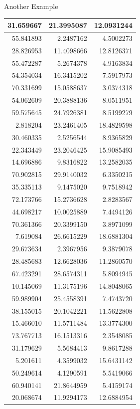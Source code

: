 \documentclass[
  ignorenonframetext,
]{beamer}
\begin{document}
\begin{frame}{Another Example}
\begin{table}
\begin{tabular}[t]{r|r|r}
\hline
31.659667 & 21.3995087 & 12.0931244\\
\hline
55.841893 & 2.2487162 & 4.5002273\\
\hline
28.826953 & 11.4098666 & 12.8126371\\
\hline
55.472287 & 5.2674378 & 4.9163834\\
\hline
54.354034 & 16.3415202 & 7.5917973\\
\hline
70.331699 & 15.0588637 & 3.0374318\\
\hline
54.062609 & 20.3888136 & 8.0511951\\
\hline
59.575645 & 24.7926381 & 8.5199279\\
\hline
2.818204 & 23.2461405 & 18.4829598\\
\hline
30.460335 & 2.5256544 & 8.9365829\\
\hline
22.343449 & 23.2046425 & 15.9085493\\
\hline
14.696886 & 9.8316822 & 13.2582035\\
\hline
70.902815 & 29.9140032 & 6.3350215\\
\hline
35.335113 & 9.1475020 & 9.7518942\\
\hline
72.173766 & 15.2736628 & 2.8283567\\
\hline
44.698217 & 10.0025889 & 7.4494126\\
\hline
70.361366 & 20.3399150 & 3.8971099\\
\hline
7.619084 & 26.6615229 & 18.6881304\\
\hline
29.673634 & 2.3967956 & 9.3879078\\
\hline
28.485683 & 12.6628036 & 11.2860570\\
\hline
67.423291 & 28.6574311 & 5.8094945\\
\hline
10.145069 & 11.3175196 & 14.8048065\\
\hline
59.989904 & 25.4558391 & 7.4743720\\
\hline
38.155015 & 20.1042221 & 11.5622808\\
\hline
15.466010 & 11.5711484 & 13.3774300\\
\hline
73.767713 & 16.1513316 & 2.3548085\\
\hline
31.179629 & 5.5684413 & 9.8617288\\
\hline
5.201611 & 4.3599032 & 15.6431142\\
\hline
50.249614 & 4.1290591 & 5.5419066\\
\hline
60.940141 & 21.8644959 & 5.4159174\\
\hline
20.068674 & 11.9294173 & 12.6884954\\

\end{tabular}
\end{table}
\end{frame}
\end{document}
